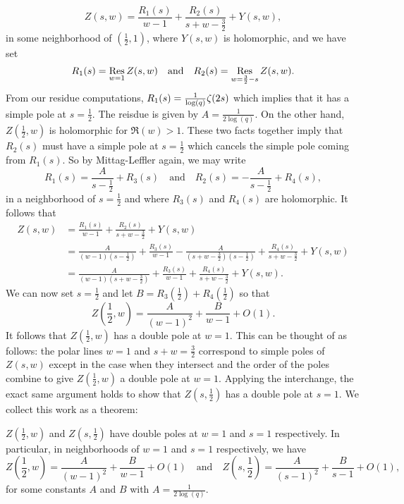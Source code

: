 \documentclass[12pt,reqno,oneside]{amsart}
\begin{document}
    \[
        Z(s,w) = \frac{R_{1}(s)}{w-1}+\frac{R_{2}(s)}{s+w-\frac{3}{2}}+Y(s,w),
    \]
    in some neighborhood of $\left(\frac{1}{2},1\right)$, where $Y(s,w)$ is holomorphic, and we have set
    \[
        R_{1}(s) = \operatorname*{\mathrm{Res}}_{w = 1}Z(s,w) \quad \text{and} \quad R_{2}(s) = \operatorname*{\mathrm{Res}}_{w = \frac{3}{2}-s}Z(s,w).
    \]
    From our residue computations, $R_{1}(s) = \frac{1}{\log(q)}\zeta(2s)$ which implies that it has a simple pole at $s = \frac{1}{2}$. The reisdue is given by $A = \frac{1}{2\log(q)}$. On the other hand, $Z\left(\frac{1}{2},w\right)$ is holomorphic for $\Re(w) > 1$. These two facts together imply that $R_{2}(s)$ must have a simple pole at $s = \frac{1}{2}$ which cancels the simple pole coming from $R_{1}(s)$. So by Mittag-Leffler again, we may write
    \[
        R_{1}(s) = \frac{A}{s-\frac{1}{2}}+R_{3}(s) \quad \text{and} \quad R_{2}(s) = -\frac{A}{s-\frac{1}{2}}+R_{4}(s),
    \]
    in a neighborhood of $s = \frac{1}{2}$ and where $R_{3}(s)$ and $R_{4}(s)$ are holomorphic. It follows that
    \begin{align*}
        Z(s,w) &= \frac{R_{1}(s)}{w-1}+\frac{R_{2}(s)}{s+w-\frac{3}{2}}+Y(s,w) \\ 
        &= \frac{A}{(w-1)\left(s-\frac{1}{2}\right)}+\frac{R_{3}(s)}{w-1}-\frac{A}{\left(s+w-\frac{3}{2}\right)\left(s-\frac{1}{2}\right)}+\frac{R_{4}(s)}{s+w-\frac{3}{2}}+Y(s,w) \\
        &= \frac{A}{(w-1)\left(s+w-\frac{3}{2}\right)}+\frac{R_{3}(s)}{w-1}+\frac{R_{4}(s)}{s+w-\frac{3}{2}}+Y(s,w).
    \end{align*}
    We can now set $s = \frac{1}{2}$ and let $B = R_{3}\left(\frac{1}{2}\right)+R_{4}\left(\frac{1}{2}\right)$ so that
    \[
        Z\left(\frac{1}{2},w\right) = \frac{A}{(w-1)^{2}}+\frac{B}{w-1}+O(1).
    \]
    It follows that $Z\left(\frac{1}{2},w\right)$ has a double pole at $w = 1$. This can be thought of as follows: the polar lines $w = 1$ and $s+w = \frac{3}{2}$ correspond to simple poles of $Z(s,w)$ except in the case when they intersect and the order of the poles combine to give $Z\left(\frac{1}{2},w\right)$ a double pole at $w = 1$. Applying the interchange, the exact same argument holds to show that $Z\left(s,\frac{1}{2}\right)$ has a double pole at $s = 1$. We collect this work as a theorem:

    \begin{theorem}\label{thm:double_poles_at_1/2}
        $Z\left(\frac{1}{2},w\right)$ and $Z\left(s,\frac{1}{2}\right)$ have double poles at $w = 1$ and $s = 1$ respectively. In particular, in neighborhoods of $w = 1$ and $s = 1$ respectively, we have
        \[
            Z\left(\frac{1}{2},w\right) = \frac{A}{(w-1)^{2}}+\frac{B}{w-1}+O(1) \quad \text{and} \quad Z\left(s,\frac{1}{2}\right) = \frac{A}{(s-1)^{2}}+\frac{B}{s-1}+O(1),
        \]
        for some constants $A$ and $B$ with $A = \frac{1}{2\log(q)}$. 
    \end{theorem}
\end{document}
